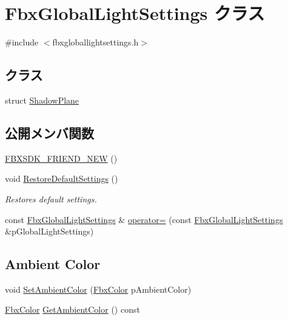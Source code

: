\hypertarget{class_fbx_global_light_settings}{}\section{Fbx\+Global\+Light\+Settings クラス}
\label{class_fbx_global_light_settings}


{\ttfamily \#include $<$fbxgloballightsettings.\+h$>$}

\subsection*{クラス}
\begin{DoxyCompactItemize}
\item 
struct \hyperlink{struct_fbx_global_light_settings_1_1_shadow_plane}{Shadow\+Plane}
\end{DoxyCompactItemize}
\subsection*{公開メンバ関数}
\begin{DoxyCompactItemize}
\item 
\hyperlink{class_fbx_global_light_settings_a75e0ecfb557240691dbaf02364c7d536}{F\+B\+X\+S\+D\+K\+\_\+\+F\+R\+I\+E\+N\+D\+\_\+\+N\+EW} ()
\item 
void \hyperlink{class_fbx_global_light_settings_a9f9a67ac3a66bb905d987a0838c9e30e}{Restore\+Default\+Settings} ()
\begin{DoxyCompactList}\small\item\em Restores default settings. \end{DoxyCompactList}\item 
const \hyperlink{class_fbx_global_light_settings}{Fbx\+Global\+Light\+Settings} \& \hyperlink{class_fbx_global_light_settings_a9a3f96233b7ede9ad5f804d10f5e024b}{operator=} (const \hyperlink{class_fbx_global_light_settings}{Fbx\+Global\+Light\+Settings} \&p\+Global\+Light\+Settings)
\end{DoxyCompactItemize}
\subsection*{Ambient Color}
\begin{DoxyCompactItemize}
\item 
void \hyperlink{class_fbx_global_light_settings_adad3dc92c22ba63443bf2421e6e257cc}{Set\+Ambient\+Color} (\hyperlink{class_fbx_color}{Fbx\+Color} p\+Ambient\+Color)
\item 
\hyperlink{class_fbx_color}{Fbx\+Color} \hyperlink{class_fbx_global_light_settings_aa57a507a5e0058d481c8a58ba04f11e2}{Get\+Ambient\+Color} () const
\end{DoxyCompactItemize}
